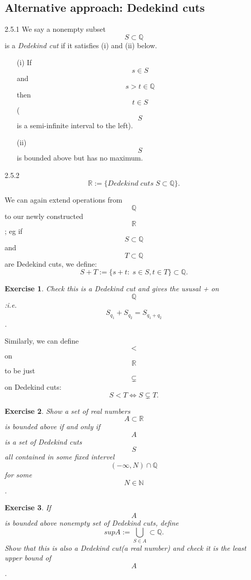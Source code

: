 \documentclass[a4paper]{article}
\def\rr{{\mathbb R}}
\def\qq{{\mathbb Q}}
\def\nn{{\mathbb N}}
\newtheorem{exercise}{Exercise}[subsection]
\begin{document}
\subsection{Alternative approach: Dedekind cuts}
\begin{definition}{2.5.1}{}
    We say a nonempty subset $$S\subset\qq$$ is a \textit{Dedekind cut} if it satisfies (i) and (ii) below.
    \begin{enumerate}
        \item[(i)] If $$s\in S$$ and $$s>t\in \qq$$ then $$ t\in S$$($$S$$ is a semi-infinite interval to the left).
        \item[(ii)] $$S$$ is bounded above but has no maximum.  
    \end{enumerate}
\end{definition}
\begin{definition}{2.5.2}{}
    \begin{equation*}
        \rr:= \{Dedekind\; cuts\;S\subset \qq\}.
    \end{equation*}
\end{definition}
We can again extend operations from $$\qq$$ to our newly constructed $$\rr$$; eg if $$S \subset \qq$$ and $$T \subset \qq$$ are Dedekind cuts, we define:
\begin{equation*}
    S+T:=\{s+t:\; s\in S, t\in T\}\subset \qq.
\end{equation*}
\begin{exercise}
    Check this is a Dedekind cut and gives the ususal + on $$\qq$$:i.e. $$S_{q_1}+S_{q_2}=S_{q_1+q_2}$$.
\end{exercise}
Similarly, we can define $$<$$ on $$\rr$$ to be just $$\subsetneq$$ on Dedekind cuts:
\begin{equation*}
S<T \Longleftrightarrow S\subsetneq T.
\end{equation*}
\begin{exercise}
    Show a set of real numbers $$A \subset \rr$$ is bounded above if and only if $$A$$ is a set of Dedekind cuts $$S$$ all contained in some fixed intervel $$(-\infty,N)\cap \qq$$ for some $$N \in \nn$$.
\end{exercise}
\begin{exercise}
    If $$A$$ is bounded above nonempty set of Dedekind cuts, define
    \begin{equation*}
        sup A := \bigcup _{S\in A} \subset \qq.
    \end{equation*} 
    Show that this is also a Dedekind cut(a real number) and check it is the least upper bound of $$A$$.
\end{exercise}
\end{document}
